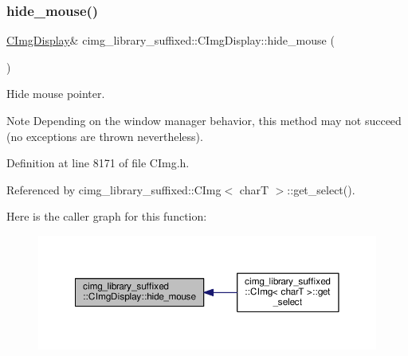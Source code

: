 \subsubsection{\texorpdfstring{hide\+\_\+mouse()}{hide\_mouse()}}
{\footnotesize\ttfamily \hyperlink{structcimg__library__suffixed_1_1CImgDisplay}{C\+Img\+Display}\& cimg\+\_\+library\+\_\+suffixed\+::\+C\+Img\+Display\+::hide\+\_\+mouse (\begin{DoxyParamCaption}{ }\end{DoxyParamCaption})\hspace{0.3cm}{\ttfamily [inline]}}



Hide mouse pointer. 

\begin{DoxyNote}{Note}
Depending on the window manager behavior, this method may not succeed (no exceptions are thrown nevertheless). 
\end{DoxyNote}


Definition at line 8171 of file C\+Img.\+h.



Referenced by cimg\+\_\+library\+\_\+suffixed\+::\+C\+Img$<$ char\+T $>$\+::get\+\_\+select().

Here is the caller graph for this function\+:
\nopagebreak
\begin{figure}[H]
\begin{center}
\leavevmode
\includegraphics[width=350pt]{d5/d53/structcimg__library__suffixed_1_1CImgDisplay_ad42869bba3895a98404a7deade4690f1_icgraph}
\end{center}
\end{figure}
\mbox{\label{structcimg__library__suffixed_1_1CImgDisplay_a6fa9d8294099dc9e1e6f67cc67e159c6}} 
